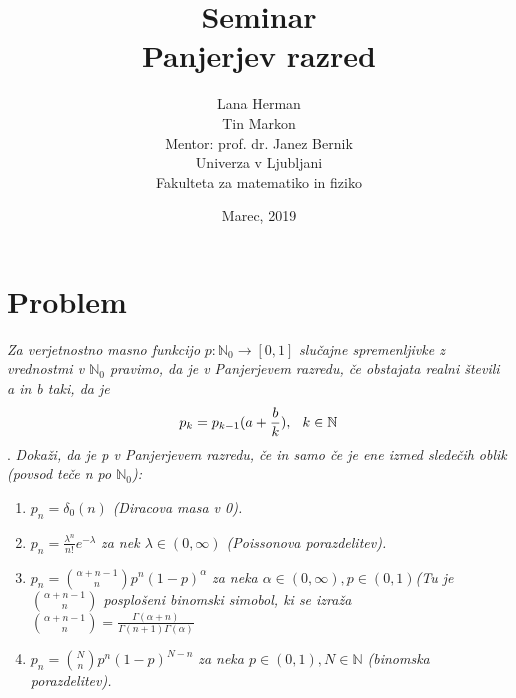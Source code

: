 \documentclass[a4paper]{article}
\title{Seminar \\\vspace{2cm} {\huge Panjerjev razred}\vspace{2cm}}
\author{Lana Herman \\[1.5mm] Tin Markon \\[1.5mm]\vspace{7cm}
Mentor: prof. dr. Janez Bernik \\
Univerza v Ljubljani \\[1.5mm]
Fakulteta za matematiko in fiziko \vspace{3cm}}
\date{Marec, 2019}
\begin{document}
\begin{titlepage}
\clearpage \maketitle
\thispagestyle{empty}
\end{titlepage} 

\tableofcontents
\pagebreak

\maketitle
\section{Problem}
\textit{Za verjetnostno masno funkcijo} $p : \mathbb{N}_{0} \rightarrow [0, 1]$ \textit{slučajne spremenljivke z vrednostmi v $\mathbb{N}_{0}$ pravimo, da je v Panjerjevem razredu, če obstajata realni števili a in b taki, da je}
$$p_k = p_{k-1}(a + \frac{b}{k}), \hspace{0.25cm}  k \in \mathbb{N}$$.
\textit{Dokaži, da je p v Panjerjevem razredu, če in samo če je ene izmed sledečih oblik (povsod teče n po $\mathbb{N}_{0}$):}
\begin{enumerate}
	\item $p_n = \delta_{0}(n)$ \textit{(Diracova masa v 0).}
	\item $p_n = \frac{\lambda^n}{n!}e^{-\lambda}$ \textit{za nek $\lambda \in (0, \infty)$ (Poissonova porazdelitev).}
	\item $p_n = {{\alpha + n - 1}\choose n}p^n(1-p)^{\alpha}$ \textit{za neka $\alpha \in (0, \infty), p \in (0,1)$(Tu je ${{\alpha + n - 1}\choose n}$ posplošeni binomski simobol, ki se izraža ${{\alpha + n - 1}\choose n} =  \frac{\Gamma(\alpha + n)}{\Gamma(n+1)\Gamma(\alpha)}$}
	\item $p_n = {N \choose n}p^n(1-p)^{N-n}$ \textit{za neka $p \in (0,1), N \in \mathbb{N}$ (binomska porazdelitev).}
\end{enumerate}
\vspace{0.5cm}
\end{document}
